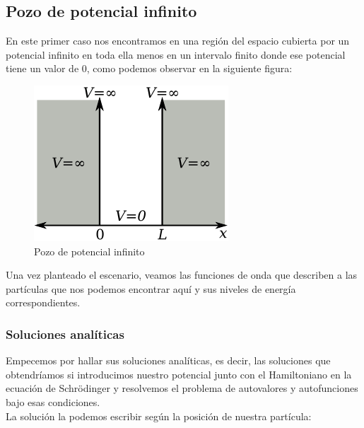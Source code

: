 \documentclass[12pt]{article}
\begin{document}
\subsection{Pozo de potencial infinito}

En este primer caso nos encontramos en una región del espacio cubierta por un potencial infinito en toda ella menos en un intervalo finito donde ese potencial tiene un valor de 0, como podemos observar en la siguiente figura:

\begin{figure}[H]
    \centering
    \includegraphics[width=0.5\linewidth]{fotos/particula-caja-wiki.png}
    \caption{Pozo de potencial infinito}
\end{figure}

Una vez planteado el escenario, veamos las funciones de onda que describen a las partículas que nos podemos encontrar aquí y sus niveles de energía correspondientes.

    \subsubsection{Soluciones analíticas}
    Empecemos por hallar sus soluciones analíticas, es decir, las soluciones que obtendríamos si introducimos nuestro potencial junto con el Hamiltoniano en la ecuación de Schrödinger y resolvemos el problema de autovalores y autofunciones bajo esas condiciones.\\

    La solución la podemos escribir según la posición de nuestra partícula:
\end{document}
